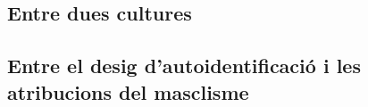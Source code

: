 \begin{comment}
\subsubsection{Quotes}
"Jo vaig anar a aportar la matrícula, ja aterrida de tants passadissos i tantes aules i si no sé ni trobar les oficines, com m'ho faré per trobar la meva classe.
 El primer dia ens van fer anar a la sala d'actes i allà van dir les llistes de cada grup. Tothom va riure quan van dir el meu nom, que el van dir tan diferent que jo no sabi ni que fos jo. És clar, en aquell lloc no hi estaven acostumats, a gent com jo. Era l'única de la classe que feia batxillerat, tota sola sense ni el noi dels ulls crema que havia de ser amb mi sempre"
 -- anders sein faellt ins Auge;
    Menschen machen sich lustig;
    Migrant*innenkids werden rausgeekelt oder von ihren Eltern aus der Schule rausgeholt

"[...] i jo que havia trencat lleis no escrites i havia decidit que no volia ser ni auxiliar d'infermeria ni administrativa de grau u ni mecànic ni electricista.
  Pesaven força espases de Dàmocles damunt meu: que si jo a la teva edat ja estava casada, que si en la teva cultura ja se sap que no val la pena, que us acaben casant tard o d'hora, la d'aquest és l'últim curs i alguna altra que tenia el pare al cap, com allò de les dones que no traeixen mai els pares però que sí que acaben traint els homes.
  Tot això duia jo a la motxilla, però ningú se'n va adonar. Al principi l'institut va ser un espai d'angoixa, que tot funcionés tan diferent" (p.273)

\end{comment}

\subsection{Entre dues cultures}

\begin{comment}
  1) la cultura d'origen representada per
     * el pare
     * la mare
     * la família amb els avis i les tietes
     * els moros de Catalunya
  2) la cultura d'acollida, representada per
     * l'escola
     * les amigues
     * les amants del pare

+ stereotips mútuus de cada grup per l'altre
\end{comment}

\subsection{Entre el desig d'autoidentificació i les atribucions del masclisme}

